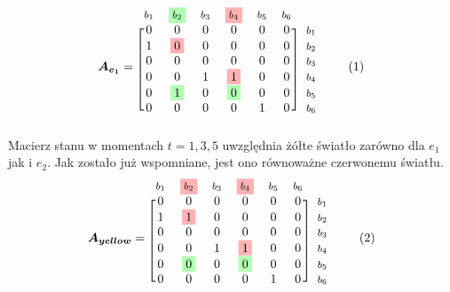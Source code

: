 \documentclass[12pt]{book}
\theoremstyle{plain}
\newcommand\addtag{\refstepcounter{equation}
\renewcommand{\labelenumii}{\theenumii}
\renewcommand{\theenumii}{\theenumi.\arabic{enumii}.}
\tag{\theequation}}
\begin{document}
\begin{equation*}
\boldsymbol{A_{e_1}}=
\begin{blockarray}{*{6}{c} l}
\begin{block}{*{6}{>{$\footnotesize}c<{$}} l}
$b_1$ & \colorbox{green!30}{$b_2$} & $b_3$ & \colorbox{red!30}{$b_4$} & $b_5$ & $b_6$ \\
\end{block}
\begin{block}{[*{6}{c}]>{$\footnotesize}l<{$}}
0 & 0                     & 0 & 0 & 0 & 0 & $b_1$ \\
1 & \colorbox{red!30}{0}  & 0 & 0 & 0 & 0 & $b_2$ \\
0 & 0                     & 0 & 0 & 0 & 0 &  $b_3$ \\
0 & 0                     & 1 & \colorbox{red!30}{1} & 0 & 0 & $b_4$ \\
0 & \colorbox{green!30}{1}  & 0 & \colorbox{green!30}{0} & 0 & 0 & $b_5$ \\
0 & 0                     & 0 & 0 & 1 & 0 & $b_6$ \\
\end{block}
\end{blockarray} \addtag
\end{equation*}
Macierz stanu w momentach $t=1,3,5$ uwzględnia żółte światło zarówno dla $e_1$ jak i $e_2$. Jak zostało już wspomniane, jest ono równoważne czerwonemu światłu.
\begin{equation*}
\boldsymbol{A_{yellow}}=
\begin{blockarray}{*{6}{c} l}
\begin{block}{*{6}{>{$\footnotesize}c<{$}} l}
$b_1$ & \colorbox{red!30}{$b_2$} & $b_3$ & \colorbox{red!30}{$b_4$} & $b_5$ & $b_6$ \\
\end{block}
\begin{block}{[*{6}{c}]>{$\footnotesize}l<{$}}
0 & 0                     & 0 & 0 & 0 & 0 & $b_1$ \\
1 & \colorbox{red!30}{1}  & 0 & 0 & 0 & 0 & $b_2$ \\
0 & 0                     & 0 & 0 & 0 & 0 &  $b_3$ \\
0 & 0                     & 1 & \colorbox{red!30}{1} & 0 & 0 & $b_4$ \\
0 & \colorbox{green!30}{0}  & 0 & \colorbox{green!30}{0} & 0 & 0 & $b_5$ \\
0 & 0                     & 0 & 0 & 1 & 0 & $b_6$ \\
\end{block}
\end{blockarray} \addtag
\end{equation*} 
\end{document}
